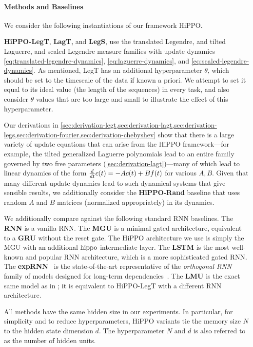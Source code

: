 \documentclass[../hippo.tex]{subfiles}
\begin{document}
\paragraph{Methods and Baselines}

We consider the following instantiations of our framework HiPPO.

\textbf{HiPPO-}\textbf{LegT}, \textbf{LagT}, and \textbf{LegS}, use the translated Legendre, and tilted Laguerre, and scaled Legendre measure families with update dynamics \eqref{eq:translated-legendre-dynamics}, \eqref{eq:laguerre-dynamics}, and \eqref{eq:scaled-legendre-dynamics}.
As mentioned, LegT has an additional hyperparameter $\theta$, which should be set to the timescale of the data if known a priori.
We attempt to set it equal to its ideal value (the length of the sequences) in every task,
and also consider $\theta$ values that are too large and small
to illustrate the effect of this hyperparameter.

Our derivations in \cref{sec:derivation-legt,sec:derivation-lagt,sec:derivation-legs,sec:derivation-fourier,sec:derivation-chebyshev} show that there is a large variety of update equations that can arise from the HiPPO framework---for example, the tilted generalized Laguerre polynomials lead to an entire family governed by two free parameters (\cref{sec:derivation-lagt})---many of which lead to linear dynamics of the form $\frac{d}{d t} c(t) = -A c(t) + B f(t)$ for various $A, B$.
Given that many different update dynamics lead to such dynamical systems that give sensible results,
we additionally consider the \textbf{HiPPO-Rand} baseline that uses random $A$ and $B$ matrices (normalized appropriately) in its dynamics.

We additionally compare against the following standard RNN baselines.
The \textbf{RNN} is a vanilla RNN.
The \textbf{MGU} is a minimal gated architecture, equivalent to a \textbf{GRU} without the reset gate. The HiPPO architecture we use is simply the MGU with an additional $\operatorname{hippo}$ intermediate layer.
The \textbf{LSTM} is the most well-known and popular RNN architecture, which is a more sophisticated gated RNN.
The \textbf{expRNN}~\citep{lezcano2019cheap} is the state-of-the-art representative of the \emph{orthogonal RNN} family of models designed for long-term dependencies~\citep{arjovsky2016unitary}.
The \textbf{LMU} is the exact same model as in \citet{voelker2019legendre}; it is equivalent to HiPPO-LegT with a different RNN architecture.

All methods have the same hidden size in our experiments.
In particular, for simplicity and to reduce hyperparameters, HiPPO variants tie the memory size $N$ to the hidden state dimension $d$.
The hyperparameter $N$ and $d$ is also referred to as the number of hidden units.
\end{document}
